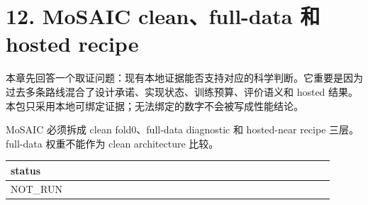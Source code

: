 \section{12. MoSAIC clean、full-data 和 hosted recipe}

本章先回答一个取证问题：现有本地证据能否支持对应的科学判断。它重要是因为过去多条路线混合了设计承诺、实现状态、训练预算、评价语义和 hosted 结果。本包只采用本地可绑定证据；无法绑定的数字不会被写成性能结论。



MoSAIC 必须拆成 clean fold0、full-data diagnostic 和 hosted-near recipe 三层。full-data 权重不能作为 clean architecture 比较。

\begin{longtable}{p{0.19\linewidth}p{0.19\linewidth}p{0.19\linewidth}p{0.19\linewidth}p{0.19\linewidth}}
\toprule
status\\
\midrule
NOT\_RUN\\
\bottomrule
\end{longtable}



\clearpage